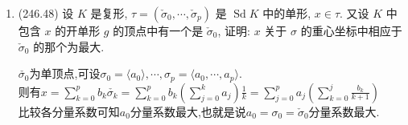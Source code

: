 \begin{enumerate}
\begin{proofc}[解答]
    \end{proofc}
    \item(246.48) 设 $K$ 是复形, $\tau = (\check{\sigma}_0, \cdots, \check{\sigma}_p)$ 是 $\operatorname{Sd} K$ 中的单形, $x \in \tau$. 
    又设 $K$ 中包含 $x$ 的开单形 $g$ 的顶点中有一个是 $\check{\sigma}_0$, 
    证明: $x$ 关于 $\sigma$ 的重心坐标中相应于 $\check{\sigma}_0$ 的那个为最大.
    \begin{proofc}
        $\check{\sigma_0}$为单顶点,可设$\sigma_0=\langle a_0\rangle,\cdots,\sigma_p=\langle a_0,\cdots,a_p\rangle$.\\
        则有$x=\sum\limits_{k=0}^pb_k\check{\sigma_k}=\sum\limits_{k=0}^pb_k(\sum\limits_{j=0}^ka_j)\frac{1}{k}=\sum\limits_{j=0}^pa_j(\sum\limits_{k=0}^j\frac{b_k}{k+1})$\\
        比较各分量系数可知$a_0$分量系数最大,也就是说$a_0=\sigma_0=\check{\sigma}_0$分量系数最大.
    \end{proofc}
\end{enumerate}

